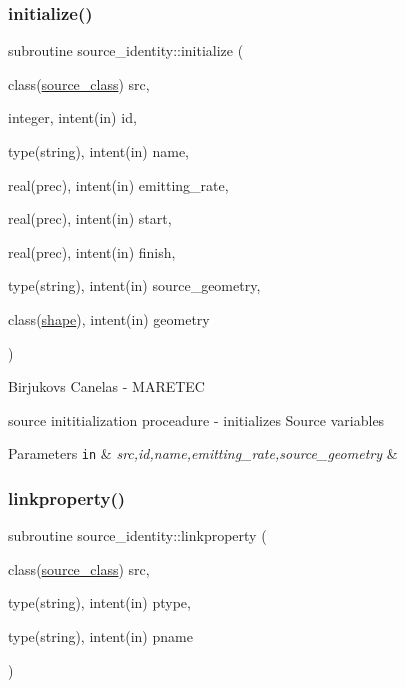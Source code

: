 \subsubsection{\texorpdfstring{initialize()}{initialize()}}
{\footnotesize\ttfamily subroutine source\+\_\+identity\+::initialize (\begin{DoxyParamCaption}\item[{class(\mbox{\hyperlink{structsource__identity_1_1source__class}{source\+\_\+class}})}]{src,  }\item[{integer, intent(in)}]{id,  }\item[{type(string), intent(in)}]{name,  }\item[{real(prec), intent(in)}]{emitting\+\_\+rate,  }\item[{real(prec), intent(in)}]{start,  }\item[{real(prec), intent(in)}]{finish,  }\item[{type(string), intent(in)}]{source\+\_\+geometry,  }\item[{class(\mbox{\hyperlink{structgeometry_1_1shape}{shape}}), intent(in)}]{geometry }\end{DoxyParamCaption})\hspace{0.3cm}{\ttfamily [private]}}



Birjukovs Canelas -\/ M\+A\+R\+E\+T\+EC 

source inititialization proceadure -\/ initializes Source variables 
\begin{DoxyParams}[1]{Parameters}
\mbox{\tt in}  & {\em src,id,name,emitting\+\_\+rate,source\+\_\+geometry} & \\
\hline
\end{DoxyParams}
\mbox{\label{namespacesource__identity_a43fd5b86e85ddeadf982708445286e26}} 
\subsubsection{\texorpdfstring{linkproperty()}{linkproperty()}}
{\footnotesize\ttfamily subroutine source\+\_\+identity\+::linkproperty (\begin{DoxyParamCaption}\item[{class(\mbox{\hyperlink{structsource__identity_1_1source__class}{source\+\_\+class}})}]{src,  }\item[{type(string), intent(in)}]{ptype,  }\item[{type(string), intent(in)}]{pname }\end{DoxyParamCaption})\hspace{0.3cm}{\ttfamily [private]}}



